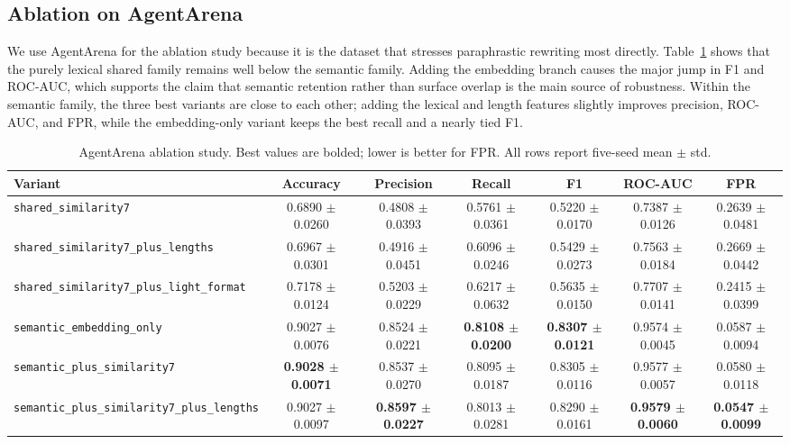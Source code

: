 \documentclass[10pt]{article}
\begin{document}
\subsection{Ablation on AgentArena}

We use AgentArena for the ablation study because it is the dataset that stresses paraphrastic rewriting most directly. Table~\ref{tab:wormshield-agentarena-ablation} shows that the purely lexical shared family remains well below the semantic family. Adding the embedding branch causes the major jump in F1 and ROC-AUC, which supports the claim that semantic retention rather than surface overlap is the main source of robustness. Within the semantic family, the three best variants are close to each other; adding the lexical and length features slightly improves precision, ROC-AUC, and FPR, while the embedding-only variant keeps the best recall and a nearly tied F1.

\begin{table}[t]
\centering
\small
\setlength{\tabcolsep}{4pt}
\caption{AgentArena ablation study. Best values are bolded; lower is better for FPR. All rows report five-seed mean $\pm$ std.}
\label{tab:wormshield-agentarena-ablation}
\begin{tabular}{lcccccc}
\toprule
Variant & Accuracy & Precision & Recall & F1 & ROC-AUC & FPR \\
\midrule
\texttt{shared\_similarity7} & 0.6890 $\pm$ 0.0260 & 0.4808 $\pm$ 0.0393 & 0.5761 $\pm$ 0.0361 & 0.5220 $\pm$ 0.0170 & 0.7387 $\pm$ 0.0126 & 0.2639 $\pm$ 0.0481 \\
\texttt{shared\_similarity7\_plus\_lengths} & 0.6967 $\pm$ 0.0301 & 0.4916 $\pm$ 0.0451 & 0.6096 $\pm$ 0.0246 & 0.5429 $\pm$ 0.0273 & 0.7563 $\pm$ 0.0184 & 0.2669 $\pm$ 0.0442 \\
\texttt{shared\_similarity7\_plus\_light\_format} & 0.7178 $\pm$ 0.0124 & 0.5203 $\pm$ 0.0229 & 0.6217 $\pm$ 0.0632 & 0.5635 $\pm$ 0.0150 & 0.7707 $\pm$ 0.0141 & 0.2415 $\pm$ 0.0399 \\
\texttt{semantic\_embedding\_only} & 0.9027 $\pm$ 0.0076 & 0.8524 $\pm$ 0.0221 & \textbf{0.8108 $\pm$ 0.0200} & \textbf{0.8307 $\pm$ 0.0121} & 0.9574 $\pm$ 0.0045 & 0.0587 $\pm$ 0.0094 \\
\texttt{semantic\_plus\_similarity7} & \textbf{0.9028 $\pm$ 0.0071} & 0.8537 $\pm$ 0.0270 & 0.8095 $\pm$ 0.0187 & 0.8305 $\pm$ 0.0116 & 0.9577 $\pm$ 0.0057 & 0.0580 $\pm$ 0.0118 \\
\texttt{semantic\_plus\_similarity7\_plus\_lengths} & 0.9027 $\pm$ 0.0097 & \textbf{0.8597 $\pm$ 0.0227} & 0.8013 $\pm$ 0.0281 & 0.8290 $\pm$ 0.0161 & \textbf{0.9579 $\pm$ 0.0060} & \textbf{0.0547 $\pm$ 0.0099} \\
\bottomrule
\end{tabular}
\end{table}
\end{document}
